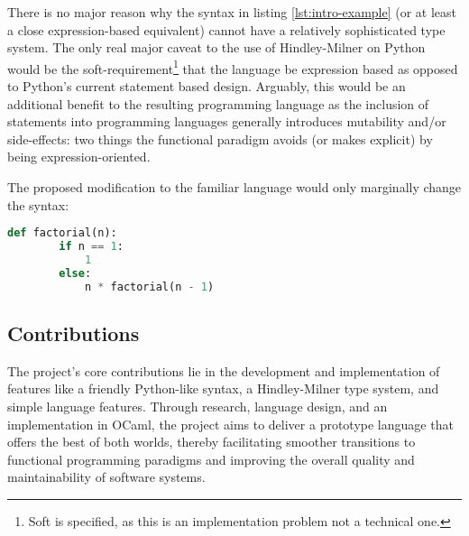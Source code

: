 \documentclass{l4proj}
\begin{document}
There is no major reason why the syntax in listing \ref{lst:intro-example} (or at least a close expression-based equivalent) cannot have a relatively sophisticated type system.
The only real major caveat to the use of Hindley-Milner on Python would be the soft-requirement\footnote{Soft is specified, as this is an implementation problem not a technical one.} that the language be expression based as opposed to Python's current statement based design.
Arguably, this would be an additional benefit to the resulting programming language as the inclusion of statements into programming languages generally introduces mutability and/or side-effects: two things the functional paradigm avoids (or makes explicit) by being expression-oriented.

The proposed modification to the familiar language would only marginally change the syntax:

\begin{lstlisting}[language=Python, caption=A proposed PyFunc program to find the factorial of a given number (n).]
    def factorial(n):
        if n == 1:
            1
        else:
            n * factorial(n - 1)
\end{lstlisting}



\subsection*{Contributions}

The project's core contributions lie in the development and implementation of features like a friendly Python-like syntax, a Hindley-Milner type system, and simple language features.
Through research, language design, and an implementation in OCaml, the project aims to deliver a prototype language that offers the best of both worlds, thereby facilitating smoother transitions to functional programming paradigms and improving the overall quality and maintainability of software systems. \citep{Hanenberg_Kleinschmager_Robbes_Tanter_Stefik_2013}
\end{document}
